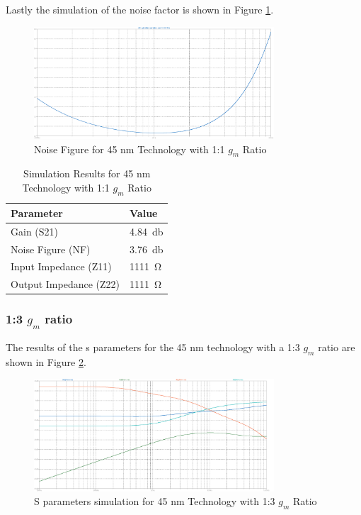 Lastly the simulation of the noise factor is shown in Figure \ref{fig:Noise45nm1to1}.
\begin{figure}[H]
    \centering
    \includegraphics[width=0.8\textwidth]{Images/Noise_45_1To1.png}
    \caption{Noise Figure for 45 nm Technology with 1:1 $g_m$ Ratio}
    \label{fig:Noise45nm1to1}
\end{figure}

\begin{table}[H]
    \centering
    \caption{Simulation Results for 45 nm Technology with 1:1 $g_m$ Ratio}
    \begin{tabularx}{\textwidth}{>{\centering\arraybackslash}X >{\centering\arraybackslash}X }
        \toprule
        \textbf{Parameter} & \textbf{Value}\\
        \midrule
        Gain (S21) & \SI{4.84}{\decibel} \\
        \midrule
        Noise Figure (NF) & \SI{3.76}{\decibel} \\
        \midrule
        Input Impedance (Z11) & \SI{1111}{\ohm} \\
        \midrule
        Output Impedance (Z22) & \SI{1111}{\ohm} \\
        \bottomrule
    \end{tabularx}
    \label{tab:45nm_1to1_results}
\end{table}
\subsubsection{1:3 $g_m$ ratio}

The results of the s parameters for the 45 nm technology with a 1:3 $g_m$ ratio are shown in Figure \ref{fig:SParam45nm1to3}. 
\begin{figure}[H]
    \centering
    \includegraphics[width=0.8\textwidth]{Images/SParam_45_1To3.png}
    \caption{S parameters simulation for 45 nm Technology with 1:3 $g_m$ Ratio}
    \label{fig:SParam45nm1to3}
\end{figure}

